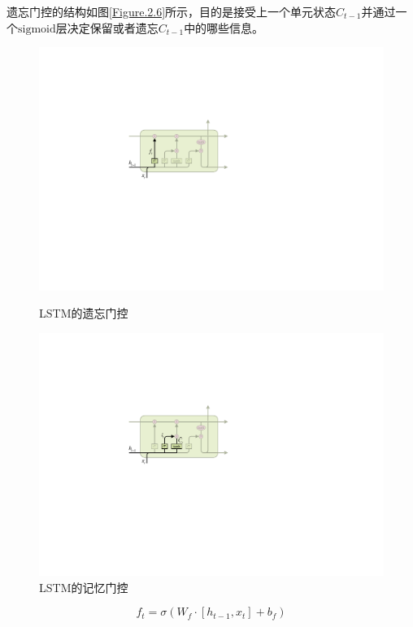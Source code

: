 \documentclass[master]{thesis-uestc}
\begin{document}
遗忘门控的结构如图\ref{Figure.2.6}所示，目的是接受上一个单元状态$C_{t-1}$并通过一个$\mathrm{sigmoid}$层决定保留或者遗忘$C_{t-1}$中的哪些信息。
\begin{figure}[!ht]
\centering 
\begin{minipage}[b]{0.45\textwidth}
\centering
\includegraphics[width=1.0\textwidth]{./pic/LSTM-f.pdf}
\caption{LSTM的遗忘门控}
\label{Figure.2.6}
\end{minipage}
\begin{minipage}[b]{0.45\textwidth} 
\centering 
\includegraphics[width=1.0\textwidth]{./pic/LSTM-i.pdf}
\caption{LSTM的记忆门控}
\label{Figure.2.7}
\end{minipage}
\end{figure}
\begin{equation}
   f_{t} = \sigma(W_f\cdot[h_{t-1},x_{t}]+b_f)
\end{equation}
\end{document}
